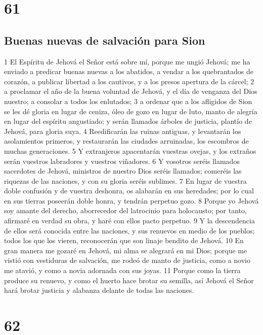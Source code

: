 \chapter{61}

\section*{Buenas nuevas de salvación para Sion}

1 El Espíritu de Jehová el Señor está sobre mí, porque me ungió Jehová; me ha enviado a predicar buenas nuevas a los abatidos, a vendar a los quebrantados de corazón, a publicar libertad a los cautivos, y a los presos apertura de la cárcel;
2 a proclamar el año de la buena voluntad de Jehová, y el día de venganza del Dios nuestro; a consolar a todos los enlutados; 
3 a ordenar que a los afligidos de Sion se les dé gloria en lugar de ceniza, óleo de gozo en lugar de luto, manto de alegría en lugar del espíritu angustiado; y serán llamados árboles de justicia, plantío de Jehová, para gloria suya.
4 Reedificarán las ruinas antiguas, y levantarán los asolamientos primeros, y restaurarán las ciudades arruinadas, los escombros de muchas generaciones.
5 Y extranjeros apacentarán vuestras ovejas, y los extraños serán vuestros labradores y vuestros viñadores.
6 Y vosotros seréis llamados sacerdotes de Jehová, ministros de nuestro Dios seréis llamados; comeréis las riquezas de las naciones, y con su gloria seréis sublimes.
7 En lugar de vuestra doble confusión y de vuestra deshonra, os alabarán en sus heredades; por lo cual en sus tierras poseerán doble honra, y tendrán perpetuo gozo.
8 Porque yo Jehová soy amante del derecho, aborrecedor del latrocinio para holocausto; por tanto, afirmaré en verdad su obra, y haré con ellos pacto perpetuo.
9 Y la descendencia de ellos será conocida entre las naciones, y sus renuevos en medio de los pueblos; todos los que los vieren, reconocerán que son linaje bendito de Jehová. 
10 En gran manera me gozaré en Jehová, mi alma se alegrará en mi Dios; porque me vistió con vestiduras de salvación, me rodeó de manto de justicia, como a novio me atavió, y como a novia adornada con sus joyas. 
11 Porque como la tierra produce su renuevo, y como el huerto hace brotar su semilla, así Jehová el Señor hará brotar justicia y alabanza delante de todas las naciones.

\chapter{62}

